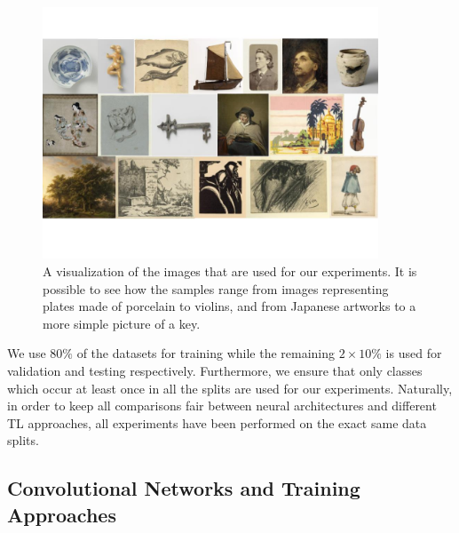 


\begin{figure}
\centering
  \includegraphics[width=10cm]{./Images/Chapter04/datasets.jpg}\vspace{-1cm}
  \caption{A visualization of the images that are used for our experiments. It is possible to see how the samples range from images representing plates made of porcelain to violins, and from Japanese artworks to a more simple picture of a key.}
  \label{fig:datasets}
\end{figure}

We use $80\%$ of the datasets for training while the remaining $2 \times 10\%$ is used for validation and testing respectively. Furthermore, we ensure that only classes which occur at least once in all the splits are used for our experiments. Naturally, in order to keep all comparisons fair between neural architectures and different TL approaches, all experiments have been performed on the exact same data splits.

\subsection{Convolutional Networks and Training Approaches}
\label{subsec: neural_nets}

